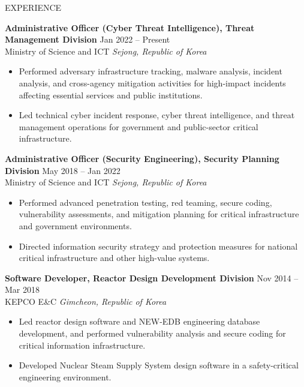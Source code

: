 \documentclass{resume}
\begin{document}
\small

\begin{rSection}{EXPERIENCE}

\textbf{Administrative Officer (Cyber Threat Intelligence), Threat Management Division} \hfill Jan 2022 -- Present\\
Ministry of Science and ICT \hfill \textit{Sejong, Republic of Korea}
\begin{itemize}
    \itemsep -4pt {}
    \item Performed adversary infrastructure tracking, malware analysis, incident analysis, and cross-agency mitigation activities for high-impact incidents affecting essential services and public institutions.
    \item Led technical cyber incident response, cyber threat intelligence, and threat management operations for government and public-sector critical infrastructure.
\end{itemize}

\textbf{Administrative Officer (Security Engineering), Security Planning Division} \hfill May 2018 -- Jan 2022\\
Ministry of Science and ICT \hfill \textit{Sejong, Republic of Korea}
\begin{itemize}
    \itemsep -4pt {}
    \item Performed advanced penetration testing, red teaming, secure coding, vulnerability assessments, and mitigation planning for critical infrastructure and government environments.
    \item Directed information security strategy and protection measures for national critical infrastructure and other high-value systems.
\end{itemize}

\textbf{Software Developer, Reactor Design Development Division} \hfill Nov 2014 -- Mar 2018\\
KEPCO E\&C \hfill \textit{Gimcheon, Republic of Korea}
\begin{itemize}
    \itemsep -4pt {}
    \item Led reactor design software and NEW-EDB engineering database development, and performed vulnerability analysis and secure coding for critical information infrastructure.
    \item Developed Nuclear Steam Supply System design software in a safety-critical engineering environment.
\end{itemize}

\end{rSection}
\end{document}

